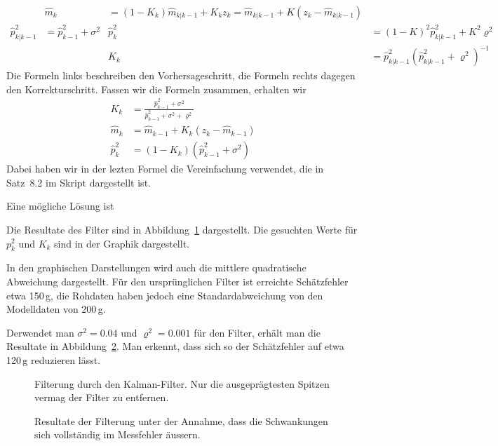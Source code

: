 \begin{loesung}
\begin{teilaufgaben}
\begin{align*}
&
\hat m_k&=(1-K_k)\hat m_{k|k-1} + K_kz_k
=
\hat m_{k|k-1} + K(z_k-\hat m_{k|k-1})
\\
\hat p_{k|k-1}^2&=\hat p_{k-1}^2 + \sigma^2
&
\hat p_k^2&=(1-K)^2\hat p_{k|k-1}^2+K^2\varrho^2
\\
&&
K_k&=\hat p_{k|k-1}^2(\hat p_{k|k-1}^2+\varrho^2)^{-1}
\end{align*}
Die Formeln links beschreiben den Vorhersageschritt, die Formeln rechts
dagegen den Korrekturschritt.
Fassen wir die Formeln zusammen, erhalten wir
\begin{align*}
K_k
&=
\frac{\hat p_{k-1}^2 + \sigma^2}{\hat p_{k-1}^2+\sigma^2+\varrho^2}
\\
\hat m_k
&=
\hat m_{k-1} + K_k(z_k - \hat m_{k-1})
\\
\hat p_k^2
&=
(1-K_k)(\hat p_{k-1}^2+\sigma^2)
\end{align*}
Dabei haben wir in der lezten Formel die Vereinfachung verwendet, die in
Satz~8.2 im Skript dargestellt ist.
\item
Eine mögliche Lösung ist 
\item
Die Resultate des Filter sind in Abbildung~\ref{90000007:filter1}
dargestellt.
Die gesuchten Werte für $p_k^2$  und $K_k$ sind in der Graphik dargestellt.
\item
In den graphischen Darstellungen wird auch die mittlere quadratische
Abweichung dargestellt.
Für den ursprünglichen Filter ist erreichte Schätzfehler etwa 150\,g,
die Rohdaten haben jedoch eine Standardabweichung von den Modelldaten
von 200\,g.
\item
Derwendet man $\sigma^2=0.04$ und $\varrho^2 = 0.001$ für den Filter,
erhält man die Resultate in Abbildung~\ref{90000007:filter2}.
Man erkennt, dass sich so der Schätzfehler auf etwa 120\,g reduzieren
lässt.
\end{teilaufgaben}
\begin{figure}
\centering
{}
\caption{Filterung durch den Kalman-Filter.
Nur die ausgeprägtesten Spitzen vermag der Filter zu entfernen.
\label{90000007:filter1}
}
\end{figure}
\begin{figure}
\centering
{}
\caption{Resultate der Filterung unter der Annahme, dass die Schwankungen
sich vollständig im Messfehler äussern.
\label{90000007:filter2}
}
\end{figure}
\end{loesung}

